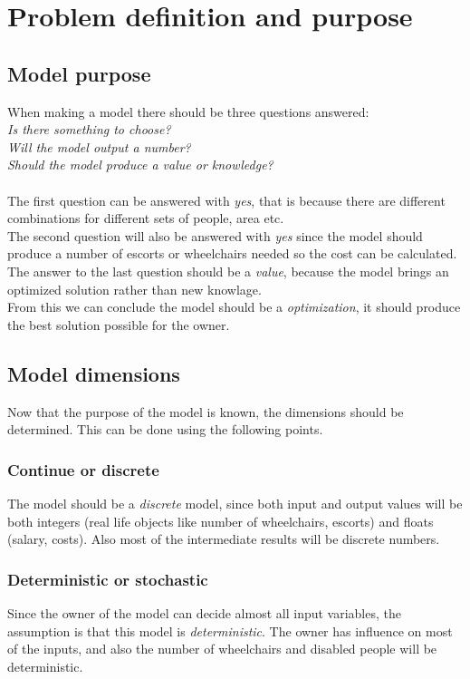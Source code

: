 \documentclass[a4paper, 11pt, notitlepage]{report}
\begin{document}
\chapter{Problem definition and purpose}
\section{Model purpose}
When making a model there should be three questions answered:\\
\emph{Is there something to choose?\\
Will the model output a number?\\
Should the model produce a value or knowledge?}\\\\
The first question can be answered with \emph{yes}, that is because there are different combinations for different sets of people, area etc.\\
The second question will also be answered with \emph{yes} since the model should produce a number of escorts or wheelchairs needed so the cost can be calculated.\\
The answer to the last question should be a \emph{value}, because the model brings an optimized solution rather than new knowlage.\\ From this we can conclude the model should be a \emph{optimization}, it should produce the best solution possible for the owner.
\section{Model dimensions}
Now that the purpose of the model is known, the dimensions should be determined. This can be done using the following points.
\subsection{Continue or discrete}
The model should be a \emph{discrete} model, since both input and output values will be both integers (real life objects like number of wheelchairs, escorts) and floats (salary, costs). Also most of the intermediate results will be discrete numbers.
\subsection{Deterministic or stochastic}
Since the owner of the model can decide almost all input variables, the assumption is that this model is \emph{deterministic}. The owner has influence on most of the inputs, and also the number of wheelchairs and disabled people will be deterministic.
\end{document}

